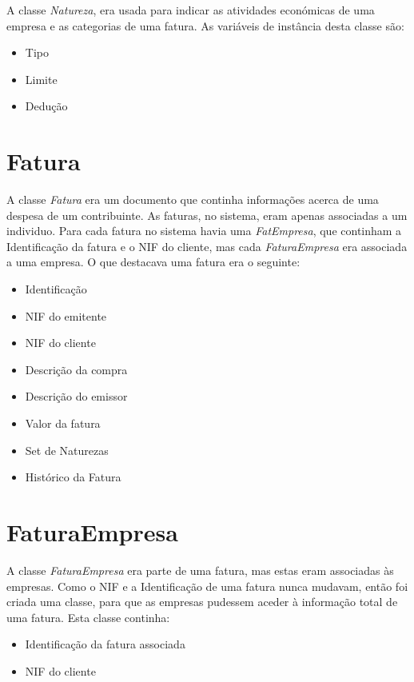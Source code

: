 \documentclass[10pt, a4paper]{report}
\begin{document}
A classe \emph{Natureza}, era usada para indicar as atividades económicas de uma empresa e as categorias de uma fatura.
As variáveis de instância desta classe são:

\begin{itemize}
	\item Tipo
	\item Limite
	\item Dedução 
\end{itemize}

\section{Fatura}\label{Fatura}

A classe \emph{Fatura} era um documento que continha informações acerca de uma despesa de um contribuinte. As faturas, no sistema, eram apenas associadas a um individuo. Para cada fatura no sistema havia uma \emph{FatEmpresa}, que continham a Identificação da fatura e o NIF do cliente, mas cada \emph{FaturaEmpresa} era associada a uma empresa. O que destacava uma fatura era o seguinte:

\begin{itemize}
	\item Identificação
	\item NIF do emitente
	\item NIF do cliente
	\item Descrição da compra
	\item Descrição do emissor
	\item Valor da fatura
	\item Set de Naturezas
	\item Histórico da Fatura
\end{itemize}

\section{FaturaEmpresa}\label{FatEmpresa}

A classe \emph{FaturaEmpresa} era parte de uma fatura, mas estas eram associadas às empresas. Como o NIF e a Identificação de uma fatura nunca mudavam, então foi criada uma classe, para que as empresas pudessem aceder à informação total de uma fatura. Esta classe continha:

\begin{itemize}
	\item Identificação da fatura associada
	\item NIF do cliente
\end{itemize}
\end{document}

